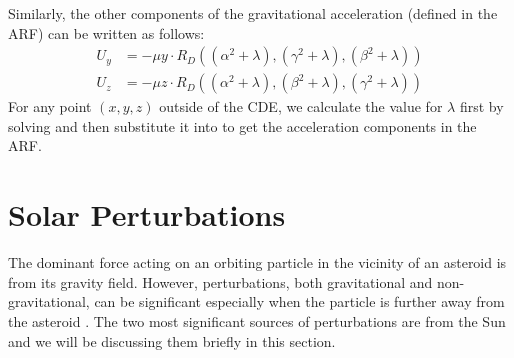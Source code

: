 Similarly, the other components of the gravitational acceleration (defined in the \gls{ARF}) can be written as follows:
\begin{align}
    U_y &= -\mu y \cdotp R_D((\alpha^2 + \lambda), (\gamma^2 + \lambda), (\beta^2 + \lambda))
    \label{eqn:grav_acc_y_carlson} \\
    U_z &= -\mu z \cdotp R_D((\alpha^2 + \lambda), (\beta^2 + \lambda), (\gamma^2 + \lambda))
    \label{eqn:grav_acc_z_carlson}
\end{align}
For any point $(x,y,z)$ outside of the \gls{CDE}, we calculate the value for $\lambda$ first by solving  and then substitute it into  to get the acceleration components in the \gls{ARF}.

\section{Solar Perturbations}
\label{sec:solar_perturbations}
The dominant force acting on an orbiting particle in the vicinity of an asteroid is from its gravity field. However, perturbations, both gravitational and non-gravitational, can be significant especially when the particle is further away from the asteroid \parencite{scheeresBook}. The two most significant sources of perturbations are from the Sun and we will be discussing them briefly in this section.

